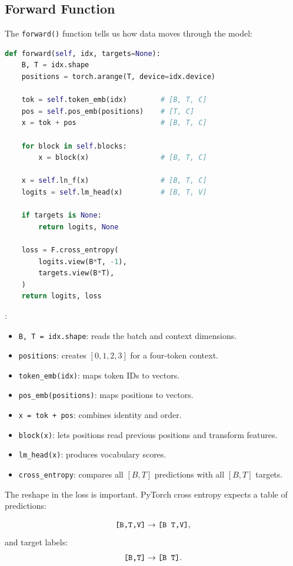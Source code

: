 \subsection{Forward Function}

The \texttt{forward()} function tells us how data moves through the model:

\begin{lstlisting}[language=Python]
def forward(self, idx, targets=None):
    B, T = idx.shape
    positions = torch.arange(T, device=idx.device)

    tok = self.token_emb(idx)        # [B, T, C]
    pos = self.pos_emb(positions)    # [T, C]
    x = tok + pos                    # [B, T, C]

    for block in self.blocks:
        x = block(x)                 # [B, T, C]

    x = self.ln_f(x)                 # [B, T, C]
    logits = self.lm_head(x)         # [B, T, V]

    if targets is None:
        return logits, None

    loss = F.cross_entropy(
        logits.view(B*T, -1),
        targets.view(B*T),
    )
    return logits, loss
\end{lstlisting}

:

\begin{itemize}
  \item \texttt{B, T = idx.shape}: reads the batch and context dimensions.
  \item \texttt{positions}: creates \([0,1,2,3]\) for a four-token context.
  \item \texttt{token\_emb(idx)}: maps token IDs to vectors.
  \item \texttt{pos\_emb(positions)}: maps positions to vectors.
  \item \texttt{x = tok + pos}: combines identity and order.
  \item \texttt{block(x)}: lets positions read previous positions and transform features.
  \item \texttt{lm\_head(x)}: produces vocabulary scores.
  \item \texttt{cross\_entropy}: compares all \([B,T]\) predictions with all \([B,T]\) targets.
\end{itemize}

The reshape in the loss is important. PyTorch cross entropy expects a table of predictions:

\[
\texttt{[B,T,V]} \rightarrow \texttt{[B T,V]},
\]
and target labels:
\[
\texttt{[B,T]} \rightarrow \texttt{[B T]}.
\]

